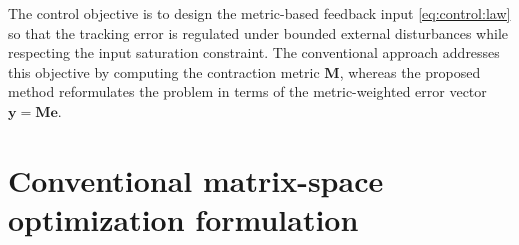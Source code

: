 \documentclass{ifacconf}
\newcommand*{\mv}[1]{\boldsymbol{#1}} %
\newcommand*{\mm}[1]{\boldsymbol{#1}} %
\begin{document}
The control objective is to design the metric-based feedback input \eqref{eq:control:law} so that the tracking error is regulated under bounded external disturbances while respecting the input saturation constraint.
The conventional approach addresses this objective by computing the contraction metric $\mm M$, whereas the proposed method reformulates the problem in terms of the metric-weighted error vector $\mv y=\mm M\mv e$.

\section{Conventional matrix-space optimization formulation} \label{sec:conv:lmi}


\end{document}
